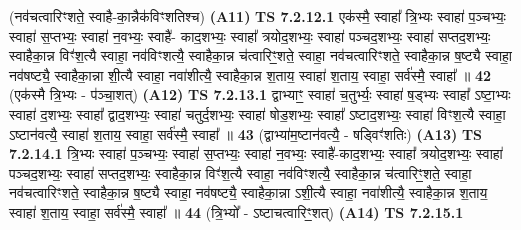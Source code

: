 \documentclass[17pt]{extarticle}
\begin{document}
                  \newline
                      (नव॑चत्वारिꣳशते॒ स्वाहै-का॒न्नैक॑विꣳशतिश्च)  \textbf{(A11)} \newline \newline
                                        \textbf{ TS 7.2.12.1} \newline
                  एक॑स्मै॒ स्वाहा᳚ त्रि॒भ्यः स्वाहा॑ प॒ञ्चभ्यः॒ स्वाहा॑ स॒प्तभ्यः॒ स्वाहा॑ न॒वभ्यः॒ स्वाहै॑- काद॒शभ्यः॒ स्वाहा᳚ त्रयोद॒शभ्यः॒ स्वाहा॑ पञ्चद॒शभ्यः॒ स्वाहा॑ सप्तद॒शभ्यः॒ स्वाहैका॒न्न विꣳ॑श॒त्यै स्वाहा॒ नव॑विꣳशत्यै॒ स्वाहैका॒न्न च॑त्वारिꣳ॒॒शते॒ स्वाहा॒ नव॑चत्वारिꣳशते॒ स्वाहैका॒न्न ष॒ष्ट्यै स्वाहा॒ नव॑षष्ट्यै॒ स्वाहैका॒न्ना शी॒त्यै स्वाहा॒ नवा॑शीत्यै॒ स्वाहैका॒न्न श॒ताय॒ स्वाहा॑ श॒ताय॒ स्वाहा॒ सर्व॑स्मै॒ स्वाहा᳚ ॥ \textbf{  42} \newline
                  \newline
                      (एक॑स्मै त्रि॒भ्यः - प॑ञ्चा॒शत्)  \textbf{(A12)} \newline \newline
                                        \textbf{ TS 7.2.13.1} \newline
                  द्वाभ्याꣳ॒॒ स्वाहा॑ च॒तुर्भ्यः॒ स्वाहा॑ ष॒ड्भ्यः स्वाहा᳚ ऽष्टा॒भ्यः स्वाहा॑ द॒शभ्यः॒ स्वाहा᳚ द्वाद॒शभ्यः॒ स्वाहा॑ चतुर्द॒शभ्यः॒ स्वाहा॑ षोड॒शभ्यः॒ स्वाहा᳚ ऽष्टाद॒शभ्यः॒ स्वाहा॑ विꣳश॒त्यै स्वाहा॒ ऽष्टान॑वत्यै॒ स्वाहा॑ श॒ताय॒ स्वाहा॒ सर्व॑स्मै॒ स्वाहा᳚ ॥ \textbf{  43} \newline
                  \newline
                      (द्वाभ्या॑म॒ष्टान॑वत्यै॒ - षड्विꣳ॑शतिः)  \textbf{(A13)} \newline \newline
                                        \textbf{ TS 7.2.14.1} \newline
                  त्रि॒भ्यः स्वाहा॑ प॒ञ्चभ्यः॒ स्वाहा॑ स॒प्तभ्यः॒ स्वाहा॑ न॒वभ्यः॒ स्वाहै॑-काद॒शभ्यः॒ स्वाहा᳚ त्रयोद॒शभ्यः॒ स्वाहा॑ पञ्चद॒शभ्यः॒ स्वाहा॑ सप्तद॒शभ्यः॒ स्वाहैका॒न्न विꣳ॑श॒त्यै स्वाहा॒ नव॑विꣳशत्यै॒ स्वाहैका॒न्न च॑त्वारिꣳ॒॒शते॒ स्वाहा॒ नव॑चत्वारिꣳशते॒ स्वाहैका॒न्न ष॒ष्ट्यै स्वाहा॒ नव॑षष्ट्यै॒ स्वाहैका॒न्ना ऽशी॒त्यै स्वाहा॒ नवा॑शीत्यै॒ स्वाहैका॒न्न श॒ताय॒ स्वाहा॑ श॒ताय॒ स्वाहा॒ सर्व॑स्मै॒ स्वाहा᳚ ॥ \textbf{  44} \newline
                  \newline
                      (त्रि॒भ्यो᳚ - ऽष्टाचत्वारिꣳ॒॒शत्)  \textbf{(A14)} \newline \newline
                                        \textbf{ TS 7.2.15.1} \newline
\end{document}
